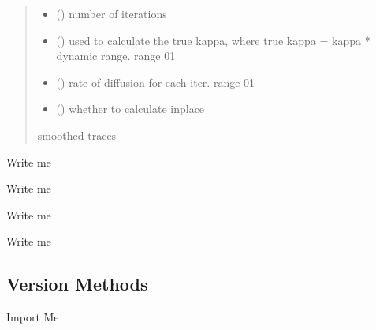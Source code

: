 \documentclass[letterpaper,10pt,english]{sphinxmanual}
\begin{document}
\begin{fulllineitems}
\begin{quote}
\begin{description}
\begin{itemize}
\item {} 
\sphinxAtStartPar
{} () \textendash{} number of iterations

\item {} 
\sphinxAtStartPar
{} () \textendash{} used to calculate the true kappa, where true kappa = kappa * dynamic range. range 0\sphinxhyphen{}1

\item {} 
\sphinxAtStartPar
{} () \textendash{} rate of diffusion for each iter. range 0\sphinxhyphen{}1

\item {} 
\sphinxAtStartPar
{} () \textendash{} whether to calculate in\sphinxhyphen{}place

\end{itemize}

\sphinxAtStartPar
smoothed traces

\sphinxAtStartPar
{}

\end{description}\end{quote}

\end{fulllineitems}

\label{\detokenize{Sub-Packages:version-module}}
\begin{DUlineblock}{0em}
\item[] Write me
\item[] Write me
\item[] Write me
\item[] Write me
\end{DUlineblock}


\subsection{Version Methods}
\label{\detokenize{Sub-Packages:version-methods}}
\begin{DUlineblock}{0em}
\item[] Import Me
\end{DUlineblock}
\end{document}

